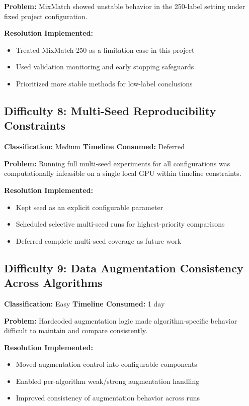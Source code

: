 \textbf{Problem:}
MixMatch showed unstable behavior in the 250-label setting under fixed project configuration.

\textbf{Resolution Implemented:}

\begin{itemize}
    \item Treated MixMatch-250 as a limitation case in this project
    \item Used validation monitoring and early stopping safeguards
    \item Prioritized more stable methods for low-label conclusions
\end{itemize}

\subsection{Difficulty 8: Multi-Seed Reproducibility Constraints}

\textbf{Classification:} Medium \quad \textbf{Timeline Consumed:} Deferred

\textbf{Problem:}
Running full multi-seed experiments for all configurations was computationally infeasible on a single local GPU within timeline constraints.

\textbf{Resolution Implemented:}

\begin{itemize}
    \item Kept seed as an explicit configurable parameter
    \item Scheduled selective multi-seed runs for highest-priority comparisons
    \item Deferred complete multi-seed coverage as future work
\end{itemize}

\subsection{Difficulty 9: Data Augmentation Consistency Across Algorithms}

\textbf{Classification:} Easy \quad \textbf{Timeline Consumed:} 1 day

\textbf{Problem:}
Hardcoded augmentation logic made algorithm-specific behavior difficult to maintain and compare consistently.

\textbf{Resolution Implemented:}

\begin{itemize}
    \item Moved augmentation control into configurable components
    \item Enabled per-algorithm weak/strong augmentation handling
    \item Improved consistency of augmentation behavior across runs
\end{itemize}

